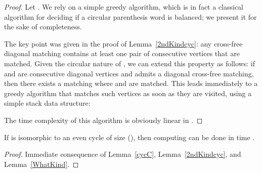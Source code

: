 \documentclass[10pt]{llncs}
\begin{document}
\begin{proof}
  Let . We rely on a simple greedy algorithm,
  which is in fact a classical algorithm for deciding if a circular
  parenthesis word is balanced; we present it for the sake of
  completeness.

  The key point was given in the proof of Lemma~\ref{2ndKindcyc}: any
  cross-free diagonal matching contains at least one pair of
  consecutive vertices that are matched. Given the circular nature of
  , we can extend this property as follows: if  and  are
  consecutive diagonal vertices and  admits a diagonal cross-free
  matching, then there exists a matching where  and  are
  matched. This leads immediately to a greedy algorithm that matches
  such vertices as soon as they are visited, using a simple stack data
  structure:
 




  \begin{center}
  \end{center}

  The time complexity of this algorithm is obviously linear in .
\end{proof}


\begin{proposition}\label{cycles}
  If  is isomorphic to an even cycle of size  (), then
  computing  can be done in time .
\end{proposition} 

\begin{proof}
  Immediate consequence of Lemma~\ref{cycC}, Lemma~\ref{2ndKindcyc},
  and Lemma~\ref{WhatKind}.\end{proof}
\end{document}
